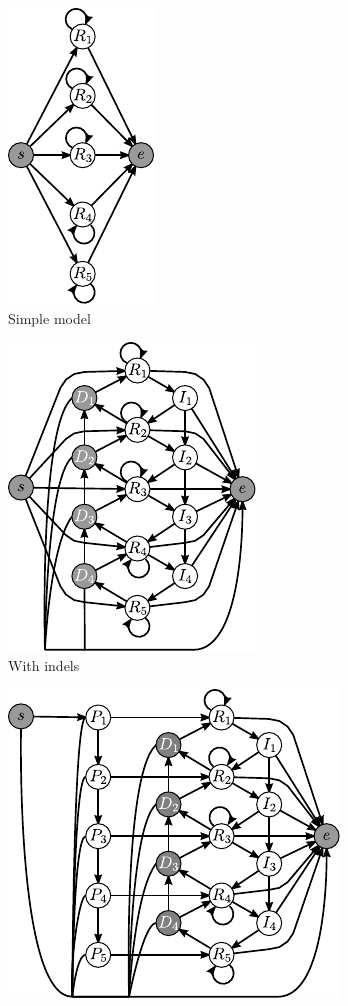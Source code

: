 \begin{figure}
\begin{center}
\begin{subfigure}{0.19\textwidth}
\includegraphics{../figures/tantan_simple.pdf}
\caption{Simple model}\label{FIGURE:TANTAN:SIMPLE}
\end{subfigure}%
\begin{subfigure}{0.3\textwidth}
\includegraphics{../figures/tantan_indel.pdf}
\caption{With indels}\label{FIGURE:TANTAN:INDEL}
\end{subfigure}%
\begin{subfigure}{0.35\textwidth}
\includegraphics{../figures/tantan_init.pdf}

\end{subfigure}
\end{center}
\end{figure}
